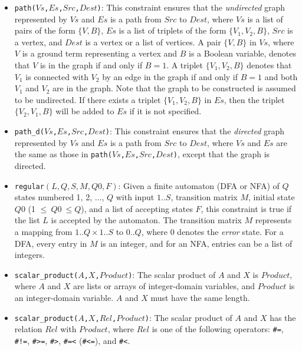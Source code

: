 \begin{itemize}
\item \texttt{path($Vs$,$Es$,$Src$,$Dest$)}: This constraint ensures that the \textit{undirected} graph represented by $Vs$ and $Es$ is a path from $Src$ to $Dest$, where $Vs$ is a list of pairs of the form $\{V,B\}$, $Es$ is a list of triplets of the form $\{V_1,V_2,B\}$, $Src$ is a vertex, and $Dest$ is a vertex or a list of vertices. A pair $\{V,B\}$ in $Vs$, where $V$ is a ground term representing a vertex and $B$ is a Boolean variable, denotes that $V$ is in the graph if and only if $B = 1$. A triplet $\{V_1,V_2,B\}$ denotes that $V_1$ is connected with $V_2$  by an edge in the graph if and only if $B = 1$ and both $V_1$ and $V_2$ are in the graph. Note that the graph to be constructed is assumed to be undirected. If there exists a triplet $\{V_1,V_2,B\}$ in $Es$, then the triplet $\{V_2,V_1,B\}$ will be added to $Es$ if it is not specified.

\item \texttt{path\_d($Vs$,$Es$,$Src$,$Dest$)}: This constraint ensures that the \textit{directed} graph represented by $Vs$ and $Es$ is a path from $Src$ to $Dest$, where $Vs$ and $Es$ are the same as those in \texttt{path($Vs$,$Es$,$Src$,$Dest$)}, except that the graph is directed.

\item \texttt{regular$(L, Q, S, M, Q0, F)$}:  Given a finite automaton (DFA or NFA) of $Q$ states numbered 1, 2, $\ldots$, $Q$ with input $1..S$, transition matrix $M$, initial state $Q0$ (1 $\le\ Q0\ \le Q$), and a list of accepting states $F$, this constraint is true if the list $L$ is accepted by the automaton. The transition matrix $M$ represents a mapping from $1..Q\times 1..S$ to $0..Q$, where $0$ denotes the {\it error} state.  For a DFA, every entry in $M$ is an integer, and for an NFA, entries can be a list of integers.

\item \texttt{scalar\_product($A$,$X$,$Product$)}: The scalar product of $A$ and $X$ is $Product$, where $A$ and $X$ are lists or arrays of integer-domain variables, and $Product$ is an integer-domain variable. $A$ and $X$ must have the same length.

\item \texttt{scalar\_product($A$,$X$,$Rel$,$Product$)}: The scalar product of $A$ and $X$ has the relation $Rel$ with $Product$, where $Rel$ is one of the following operators: \verb+#=+, \verb+#!=+, \verb+#>=+, \verb+#>+, \verb+#=<+ (\verb+#<=+), and \verb+#<+. 


\end{itemize}
